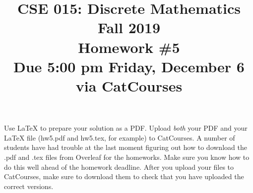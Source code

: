 \documentclass[11pt]{article}
\begin{document}
\title{\vspace{-1.5cm}CSE 015: Discrete Mathematics\\
Fall 2019\\
Homework \#5\\
Due 5:00 pm Friday, December 6 via CatCourses}
\date{}
\maketitle

\vspace{-1.5cm}

\noindent Use LaTeX to prepare your solution as a PDF. Upload \emph{both} your PDF and your LaTeX file (hw5.pdf and hw5.tex, for example) to CatCourses. A number of students have had trouble at the last moment figuring out how to download the .pdf and .tex files from Overleaf for the homeworks. Make sure you know how to do this well ahead of the homework deadline. After you upload your files to CatCourses, make sure to download them to check that you have uploaded the correct versions.
\end{document}
